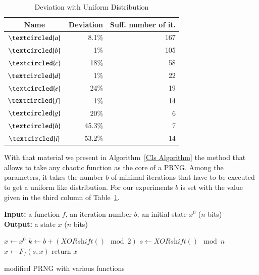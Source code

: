 \begin{table}
\centering
\begin{tabular}{|c|r|r|}
\hline
Name & Deviation & Suff. number of it. \\

\hline
$\textcircled{a}$ &  8.1\% & 167 \\
\hline
$\textcircled{b}$ &  1\%  & 105 \\
\hline
$\textcircled{c}$ &  18\% & 58 \\
\hline
$\textcircled{d}$ &  1\% & 22  \\
\hline
$\textcircled{e}$ &  24\% & 19 \\
\hline
$\textcircled{f}$ &  1\%  & 14 \\
\hline
$\textcircled{g}$ &  20\% &  6 \\
\hline
$\textcircled{h}$ & 45.3\% & 7 \\
\hline
$\textcircled{i}$ & 53.2\%& 14 \\
\hline
\end{tabular}
\caption{Deviation with Uniform Distribution \label{tab:dev}}
\end{table}




With that material we present in Algorithm~\ref{CIs Algorithm}
the method that allows to take any chaotic function as 
the core of a PRNG.
Among the parameters, it takes the number $b$ of minimal iterations
that have to be executed to get a uniform like 
distribution. For our experiments $b$ is set with the value 
given in the third column of Table~\ref{tab:dev}.
\begin{algorithm}
\textbf{Input:} a function $f$, an iteration number $b$, an initial state $x^0$ ($n$ bits)\\
\textbf{Output:} a state $x$ ($n$ bits)
\begin{algorithmic}[1]
\STATE$x\leftarrow x^0$\;
\STATE$k\leftarrow b + (\textit{XORshift}() \mod 2)$\;
{
\STATE$s\leftarrow{\textit{XORshift}() \mod n}$\;
\STATE$x\leftarrow{F_f(s,x)}$\;
}\ENDFOR
\STATE return $x$\;
\medskip
\caption{modified PRNG with various functions}
\label{CIs Algorithm}
\end{algorithmic}
\end{algorithm}



